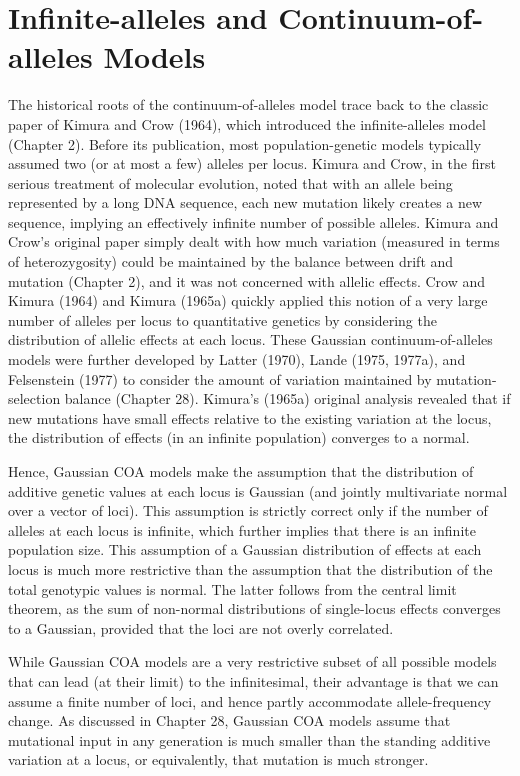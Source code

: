 \documentclass{article}
\begin{document}
\section{Infinite-alleles and Continuum-of-alleles Models}
The historical roots of the continuum-of-alleles model trace back to the classic paper of Kimura and Crow (1964), which introduced the infinite-alleles model (Chapter 2). Before its publication, most population-genetic models typically assumed two (or at most a few) alleles per locus. Kimura and Crow, in the first serious treatment of molecular evolution, noted that with an allele being represented by a long DNA sequence, each new mutation likely creates a new sequence, implying an effectively infinite number of possible alleles. Kimura and Crow's original paper simply dealt with how much variation (measured in terms of heterozygosity) could be maintained by the balance between drift and mutation (Chapter 2), and it was not concerned with allelic effects. Crow and Kimura (1964) and Kimura (1965a) quickly applied this notion of a very large number of alleles per locus to quantitative genetics by considering the distribution of allelic effects at each locus. These Gaussian continuum-of-alleles models were further developed by Latter (1970), Lande (1975, 1977a), and Felsenstein (1977) to consider the amount of variation maintained by mutation-selection balance (Chapter 28). Kimura's (1965a) original analysis revealed that if new mutations have small effects relative to the existing variation at the locus, the distribution of effects (in an infinite population) converges to a normal.

Hence, Gaussian COA models make the assumption that the distribution of additive genetic values at each locus is Gaussian (and jointly multivariate normal over a vector of loci). This assumption is strictly correct only if the number of alleles at each locus is infinite, which further implies that there is an infinite population size. This assumption of a Gaussian distribution of effects at each locus is much more restrictive than the assumption that the distribution of the total genotypic values is normal. The latter follows from the central limit theorem, as the sum of non-normal distributions of single-locus effects converges to a Gaussian, provided that the loci are not overly correlated.

While Gaussian COA models are a very restrictive subset of all possible models that can lead (at their limit) to the infinitesimal, their advantage is that we can assume a finite number of loci, and hence partly accommodate allele-frequency change. As discussed in Chapter 28, Gaussian COA models assume that mutational input in any generation is much smaller than the standing additive variation at a locus, or equivalently, that mutation is much stronger.
\end{document}
